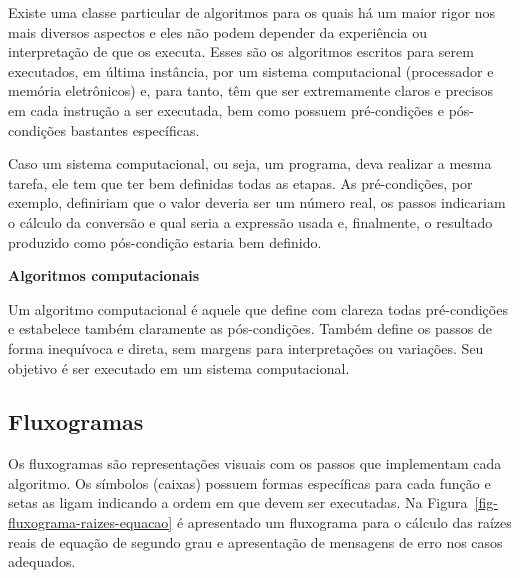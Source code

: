 \documentclass[
  11pt,
  a4paper,
]{scrbook}
\begin{document}
Existe uma classe particular de algoritmos para os quais há um maior
rigor nos mais diversos aspectos e eles não podem depender da
experiência ou interpretação de que os executa. Esses são os algoritmos
escritos para serem executados, em última instância, por um sistema
computacional (processador e memória eletrônicos) e, para tanto, têm que
ser extremamente claros e precisos em cada instrução a ser executada,
bem como possuem pré-condições e pós-condições bastantes específicas.

Caso um sistema computacional, ou seja, um programa, deva realizar a
mesma tarefa, ele tem que ter bem definidas todas as etapas. As
pré-condições, por exemplo, definiriam que o valor deveria ser um número
real, os passos indicariam o cálculo da conversão e qual seria a
expressão usada e, finalmente, o resultado produzido como pós-condição
estaria bem definido.

\begin{tcolorbox}[enhanced jigsaw, colback=white, arc=.35mm, colframe=quarto-callout-color-frame, toprule=.15mm, leftrule=.75mm, left=2mm, rightrule=.15mm, bottomrule=.15mm, opacityback=0, breakable]

\vspace{-3mm}\textbf{Algoritmos computacionais}\vspace{3mm}

 Um algoritmo computacional é aquele
que define com clareza todas pré-condições e estabelece também
claramente as pós-condições. Também define os passos de forma inequívoca
e direta, sem margens para interpretações ou variações. Seu objetivo é
ser executado em um sistema computacional.

\end{tcolorbox}

\subsection{Fluxogramas}\label{fluxogramas}

Os fluxogramas são representações visuais com os passos que implementam
cada algoritmo. Os símbolos (caixas) possuem formas específicas para
cada função e setas as ligam indicando a ordem em que devem ser
executadas. Na Figura~\ref{fig-fluxograma-raizes-equacao} é apresentado
um fluxograma para o cálculo das raízes reais de equação de segundo grau
e apresentação de mensagens de erro nos casos adequados.
\end{document}
